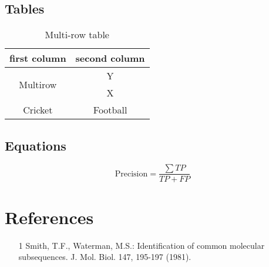 \documentclass[12pt]{article}
\begin{document}
\subsection{Tables}
\begin{table}[h!]
    \centering
    \caption{Multi-row table}
    \begin{tabular}{|c|c|}
        \hline
        \textbf{first column}     & \textbf{second column} \\ \hline
        \multirow{2}{*}{Multirow} & Y                      \\ \cline{2-2}
                                  & X                      \\ \hline
        Cricket                   & Football               \\ \hline
    \end{tabular}
\end{table}

\subsection{Equations}
\begin{equation}
    \text{Precision} = \frac{\sum TP}{TP + FP}
\end{equation}

\section*{References}
\begin{itemize}
    \item[1] Smith, T.F., Waterman, M.S.: Identification of common molecular subsequences. J. Mol. Biol. 147, 195-197 (1981).
\end{itemize}
\end{document}
